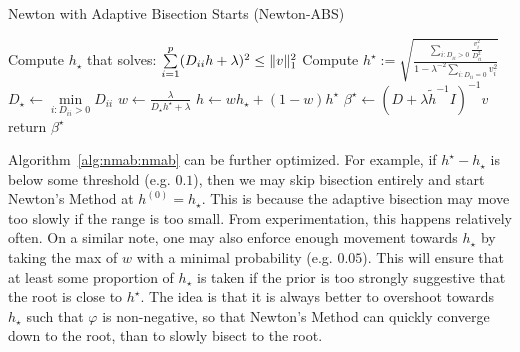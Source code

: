 \begin{algorithm}
    \caption{Newton with Adaptive Bisection Starts (Newton-ABS)}\label{alg:nmab:nmab}
    Compute $h_\star$ that solves:
    $
        \sum\limits_{i=1}^p
        (D_{ii} h + \lambda)^2
        \leq
        \|v\|_1^2
    $\;
    Compute 
    $
        h^\star
        := 
        \sqrt{
            \frac{
                \sum\limits_{i: D_{ii} > 0} \frac{v_i^2}{D_{ii}^2}
            }{
                1 - \lambda^{-2} \sum\limits_{i : D_{ii} = 0} v_i^2            
            }
        }
    $\;
    $D_\star \gets \min\limits_{i : D_{ii} > 0} D_{ii}$\;
    $w \gets \frac{\lambda}{D_\star h^\star + \lambda}$\;
    $h \gets wh_\star + (1-w)h^\star$\;
    $\beta^\star \gets (D + \lambda \tilde{h}^{-1} I)^{-1} v$\;
    return $\beta^\star$\;
\end{algorithm}

Algorithm~\ref{alg:nmab:nmab} can be further optimized.
For example, if $h^\star - h_\star$ is below some threshold (e.g. $0.1$),
then we may skip bisection entirely and start Newton's Method at $h^{(0)} = h_\star$.
This is because the adaptive bisection may move too slowly if the range is too small.
From experimentation, this happens relatively often.
On a similar note, one may also enforce enough movement towards $h_\star$
by taking the max of $w$ with a minimal probability (e.g. $0.05$).
This will ensure that at least some proportion of $h_\star$ is taken 
if the prior is too strongly suggestive that the root is close to $h^\star$.
The idea is that it is always better to overshoot towards $h_\star$ such that $\varphi$ is non-negative,
so that Newton's Method can quickly converge down to the root,
than to slowly bisect to the root.
